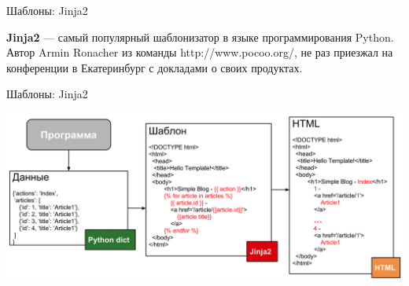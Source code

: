 \begin{frame}{Шаблоны: Jinja2}

  \textbf{Jinja2} — самый популярный шаблонизатор в языке программирования
  Python. Автор Armin Ronacher из команды http://www.pocoo.org/, не раз
  приезжал на конференции в Екатеринбург с докладами о своих продуктах.

\end{frame}


\begin{frame}{Шаблоны: Jinja2}

  \begin{center}
    \includegraphics[width=\textwidth,height=\textheight,keepaspectratio]{media/template.png}
  \end{center}

\end{frame}



